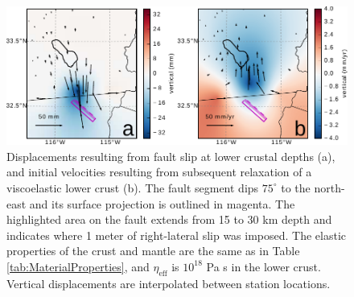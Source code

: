 \documentclass[draft,linenumbers]{AGUJournal}
\begin{document}
\begin{figure}
\includegraphics[scale=0.9]{Figures/Cancellation}
\caption{Displacements resulting from fault slip at lower crustal depths (a), and initial velocities resulting from subsequent relaxation of a viscoelastic lower crust (b).  The fault segment dips $75^\circ$ to the north-east and its surface projection is outlined in magenta.  The highlighted area on the fault extends from 15 to 30 km depth and indicates where 1 meter of right-lateral slip was imposed.  The elastic properties of the crust and mantle are the same as in Table \ref{tab:MaterialProperties}, and $\eta_\mathrm{eff}$  is $10^{18}$ Pa s in the lower crust.  Vertical displacements are interpolated between station locations.}
\label{fig:LowerCrust}
\end{figure}
 
\end{document}
